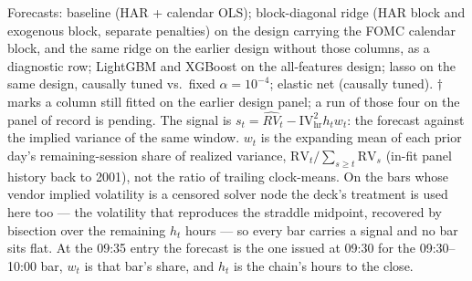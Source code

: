 \documentclass{article}
\begin{document}
\smallskip
\noindent\small Forecasts: baseline (HAR + calendar OLS); block-diagonal ridge (HAR block and exogenous block, separate penalties) on the design carrying the FOMC calendar block, and the same ridge on the earlier design without those columns, as a diagnostic row; LightGBM and XGBoost on the all-features design; lasso on the same design, causally tuned vs.\ fixed $\alpha=10^{-4}$; elastic net (causally tuned). $\dagger$ marks a column still fitted on the earlier design panel; a run of those four on the panel of record is pending. The signal is $s_t=\widehat{RV}_t-\mathrm{IV}^{2}_{\mathrm{hr}}h_t w_t$: the forecast against the implied variance of the same window. $w_t$ is the expanding mean of each prior day's remaining-session share of realized variance, $\mathrm{RV}_t/\sum_{s\ge t}\mathrm{RV}_s$ (in-fit panel history back to 2001), not the ratio of trailing clock-means. On the bars whose vendor implied volatility is a censored solver node the deck's treatment is used here too --- the volatility that reproduces the straddle midpoint, recovered by bisection over the remaining $h_t$ hours --- so every bar carries a signal and no bar sits flat. At the 09:35 entry the forecast is the one issued at 09:30 for the 09:30--10:00 bar, $w_t$ is that bar's share, and $h_t$ is the chain's hours to the close.
\end{document}
